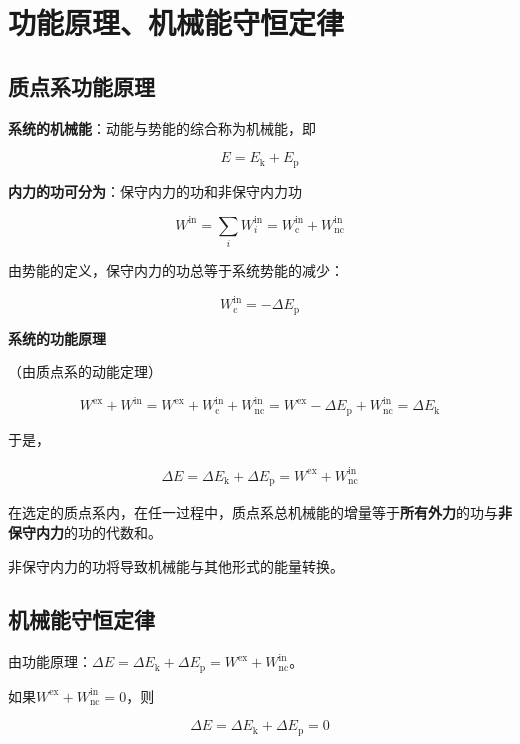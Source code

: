 \documentclass[
	12pt, %
	a4paper, %
]{myLegrandOrangeBook}
\begin{document}
\section{功能原理、机械能守恒定律}

\subsection{质点系功能原理}

\textbf{系统的机械能}：动能与势能的综合称为机械能，即

\[
    E = E_{\mathrm{k}} + E_{\mathrm{p}}
\]

\textbf{内力的功可分为}：保守内力的功和非保守内力功

\[
    W^{\mathrm{in}} = \sum_{i} W_{i}^{\mathrm{in}} =
    W_{\mathrm{c}}^{\mathrm{in}} + W_{\mathrm{nc}}^{\mathrm{in}}
\]

由势能的定义，保守内力的功总等于系统势能的减少：

\[
    W_{\mathrm{c}}^{\mathrm{in}} = - \Delta E_{\mathrm{p}}
\]

\textbf{系统的功能原理}

（由质点系的动能定理）

\[
    W^{\mathrm{ex}} + W^{\mathrm{in}} = W^{\mathrm{ex}} + W_{\mathrm{c}}^{\mathrm{in}}
    + W_{\mathrm{nc}}^{\mathrm{in}} = W^{\mathrm{ex}} - \Delta E_{\mathrm{p}} +
    W_{\mathrm{nc}}^{\mathrm{in}} = \Delta E_{\mathrm{k}}
\]

于是，

\begin{align}
    \Delta E = \Delta E_{\mathrm{k}} + \Delta E_{\mathrm{p}} =
    W^{\mathrm{ex}} + W_{\mathrm{nc}}^{\mathrm{in}}
\end{align}

在选定的质点系内，在任一过程中，质点系总机械能的增量等于\textbf{所有外力}的功与\textbf{非保守内力}的功的代数和。

非保守内力的功将导致机械能与其他形式的能量转换。

\subsection{机械能守恒定律}

由功能原理：$\Delta E = \Delta E_{\mathrm{k}} + \Delta E_{\mathrm{p}} =
W^{\mathrm{ex}} + W_{\mathrm{nc}}^{\mathrm{in}}$。

如果$W^{\mathrm{ex}} + W_{\mathrm{nc}}^{\mathrm{in}} = 0$，则

\[
    \Delta E = \Delta E_{\mathrm{k}} + \Delta E_{\mathrm{p}} = 0
\]
\end{document}
